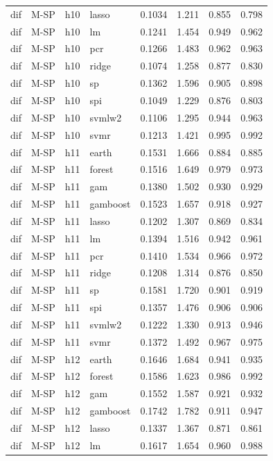\begin{ThreePartTable}
\begin{longtable}[t]{llclcccc}
dif & M-SP & h10 & lasso & 0.1034 & 1.211 & 0.855 & 0.798\\
dif & M-SP & h10 & lm & 0.1241 & 1.454 & 0.949 & 0.962\\
dif & M-SP & h10 & pcr & 0.1266 & 1.483 & 0.962 & 0.963\\
dif & M-SP & h10 & ridge & 0.1074 & 1.258 & 0.877 & 0.830\\
dif & M-SP & h10 & sp & 0.1362 & 1.596 & 0.905 & 0.898\\
dif & M-SP & h10 & spi & 0.1049 & 1.229 & 0.876 & 0.803\\
dif & M-SP & h10 & svmlw2 & 0.1106 & 1.295 & 0.944 & 0.963\\
dif & M-SP & h10 & svmr & 0.1213 & 1.421 & 0.995 & 0.992\\
\addlinespace
dif & M-SP & h11 & earth & 0.1531 & 1.666 & 0.884 & 0.885\\
dif & M-SP & h11 & forest & 0.1516 & 1.649 & 0.979 & 0.973\\
dif & M-SP & h11 & gam & 0.1380 & 1.502 & 0.930 & 0.929\\
dif & M-SP & h11 & gamboost & 0.1523 & 1.657 & 0.918 & 0.927\\
dif & M-SP & h11 & lasso & 0.1202 & 1.307 & 0.869 & 0.834\\
dif & M-SP & h11 & lm & 0.1394 & 1.516 & 0.942 & 0.961\\
dif & M-SP & h11 & pcr & 0.1410 & 1.534 & 0.966 & 0.972\\
dif & M-SP & h11 & ridge & 0.1208 & 1.314 & 0.876 & 0.850\\
dif & M-SP & h11 & sp & 0.1581 & 1.720 & 0.901 & 0.919\\
dif & M-SP & h11 & spi & 0.1357 & 1.476 & 0.906 & 0.906\\
dif & M-SP & h11 & svmlw2 & 0.1222 & 1.330 & 0.913 & 0.946\\
dif & M-SP & h11 & svmr & 0.1372 & 1.492 & 0.967 & 0.975\\
\addlinespace
dif & M-SP & h12 & earth & 0.1646 & 1.684 & 0.941 & 0.935\\
dif & M-SP & h12 & forest & 0.1586 & 1.623 & 0.986 & 0.992\\
dif & M-SP & h12 & gam & 0.1552 & 1.587 & 0.921 & 0.932\\
dif & M-SP & h12 & gamboost & 0.1742 & 1.782 & 0.911 & 0.947\\
dif & M-SP & h12 & lasso & 0.1337 & 1.367 & 0.871 & 0.861\\
dif & M-SP & h12 & lm & 0.1617 & 1.654 & 0.960 & 0.988\\

\end{longtable}
\end{ThreePartTable}
